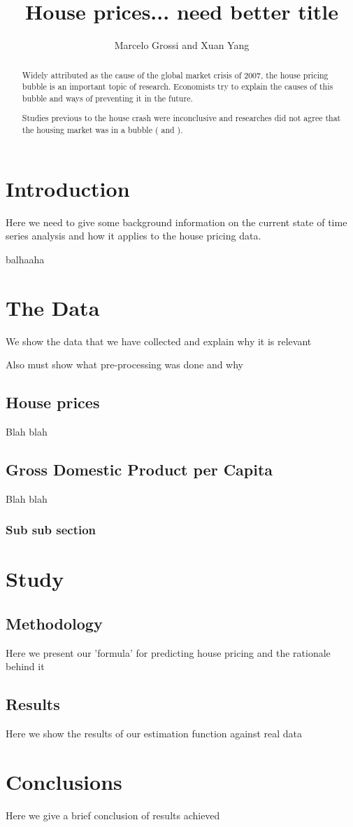 \documentclass{article}
\title{House prices... need better title}
\author{Marcelo Grossi and Xuan Yang}
\begin{document}
\maketitle
\begin{abstract}
Widely attributed as the cause of the global market crisis of 2007, the house pricing bubble is an important topic of research. Economists try to explain the causes of this bubble and ways of preventing it in the future.
\par
Studies previous to the house crash were inconclusive and researches did not agree that the housing market was in a bubble (\citep{unknown2010} and \citep{winter2003}).
\end{abstract}
\section{Introduction}
Here we need to give some background information on the current state of time series analysis and how it applies to the house pricing data.
\par
balhaaha \citep{mcmurry2012a}
\section{The Data}
We show the data that we have collected and explain why it is relevant
\par
Also must show what pre-processing was done and why
\subsection{House prices}
Blah blah
\subsection{Gross Domestic Product per Capita}
Blah blah
\subsubsection{Sub sub section}
\section{Study}
\subsection{Methodology}
Here we present our 'formula' for predicting house pricing and the rationale behind it
\subsection{Results}
Here we show the results of our estimation function against real data
\section{Conclusions}
Here we give a brief conclusion of results achieved

\end{document}
